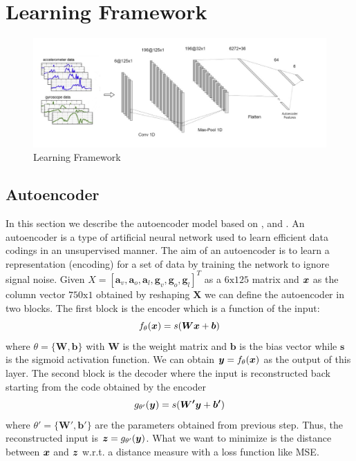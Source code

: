 \section{Learning Framework}
\label{sec:learning_framework}

\begin{figure}[h]
	\centering
	\includegraphics[width=1\textwidth]{images/full_architecture.jpg}
	\caption{Learning Framework}
\end{figure}

\subsection{Autoencoder}

In this section we describe the autoencoder model based on
\cite{vincent2010stacked}, \cite{gu2018locomotion} and
\cite{gao2019human}. An autoencoder is a type of artificial neural
network used to learn efficient data codings in an unsupervised
manner. The aim of an autoencoder is to learn a representation
(encoding) for a set of data by training the network to ignore signal
noise. Given $X = [ \boldsymbol{a}_v, \boldsymbol{a}_o,
  \boldsymbol{a}_l, \boldsymbol{g}_v, \boldsymbol{g}_o,
  \boldsymbol{g}_l ]^T$ as a $6\text{x}125$ matrix and $\boldsymbol{x}$ as the
column vector $750\text{x}1$ obtained by reshaping $\boldsymbol{X}$ we
can define the autoencoder in two blocks. The first block is the
encoder which is a function of the input:
\begin{equation}
  f_\theta(\boldsymbol{x}) = s(\boldsymbol{W}\boldsymbol{x} + \boldsymbol{b})
\end{equation}
where $\theta = \{ \boldsymbol{W}, \boldsymbol{b} \}$ with
$\boldsymbol{W}$ is the weight matrix and $\boldsymbol{b}$ is the bias
vector while $\boldsymbol{s}$ is the sigmoid activation function. We
can obtain $\boldsymbol{y} = f_\theta(\boldsymbol{x})$ as the output of this
layer. The second block is the decoder where the input is
reconstructed back starting from the code obtained by the encoder
\begin{equation}
  g_{\theta'}(\boldsymbol{y}) = s(\boldsymbol{W'}\boldsymbol{y} + \boldsymbol{b'})
\end{equation}
where $\theta' = \{ \boldsymbol{W'}, \boldsymbol{b'} \}$ are the
parameters obtained from previous step. Thus, the reconstructed input
is $\boldsymbol{z} = g_{\theta'}(\boldsymbol{y})$. What we want to minimize is the distance
between $\boldsymbol{x}$ and $\boldsymbol{z}$ w.r.t. a distance measure with a loss function
like MSE.

